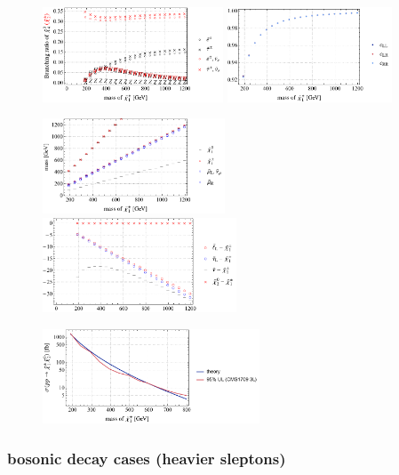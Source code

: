 \documentclass[a4paper,10pt,captions=tableheading,DIV=14]{scrartcl}
\numberwithin{equation}{section}
\begin{document}
\begin{figure}[h!]\centering
  \includegraphics[height=80pt]{../plots/plot_tab2x095_br21.pdf}
  \includegraphics[height=80pt]{../plots/plot_tab2x095_cfactors.pdf}\par
  \includegraphics[height=80pt]{../plots/plot_tab2x095_mass.pdf}
  \includegraphics[height=80pt]{../plots/plot_tab2x095_massdiff.pdf}\par
  \includegraphics[height=80pt]{../plots/plot_tab2x095_limit21.pdf}
\end{figure}

\clearpage
\subsubsection{bosonic decay cases (heavier sleptons)}
\end{document}
